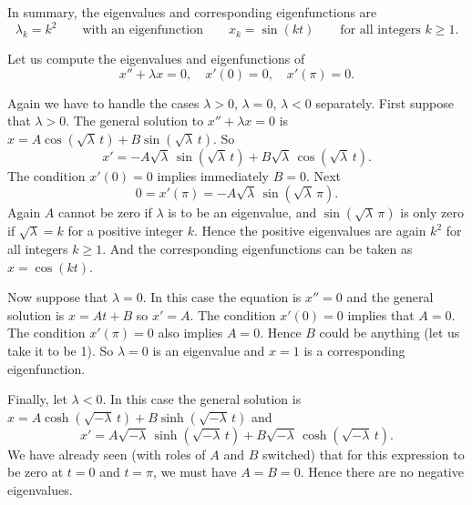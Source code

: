 \documentclass{ximera}
\begin{document}
\begin{exampleSol}
    In summary, the eigenvalues and corresponding eigenfunctions are
    \begin{equation*}
        \lambda_k = k^2 \qquad \text{with an eigenfunction} \qquad x_k = \sin (k t) \qquad \text{for all integers } k \geq 1 .
    \end{equation*}
\end{exampleSol}

\begin{example}
    Let us compute the eigenvalues and eigenfunctions of
    \begin{equation*}
        x'' + \lambda x = 0, \quad x'(0) = 0, \quad x'(\pi) = 0 .
    \end{equation*}
\end{example}

\begin{exampleSol}
    Again we have to handle the cases $\lambda > 0$, $\lambda = 0$, $\lambda < 0$ separately. First suppose that $\lambda > 0$. The general solution to $x''+\lambda x = 0$ is $x = A \cos ( \sqrt{\lambda}\, t) + B \sin ( \sqrt{\lambda}\, t)$.  So
    \begin{equation*}
        x' = -A\sqrt{\lambda}\, \sin ( \sqrt{\lambda}\, t) + B\sqrt{\lambda}\, \cos (\sqrt{\lambda}\, t) .
    \end{equation*}
    The condition $x'(0) = 0$ implies immediately $B = 0$. Next
    \begin{equation*}
        0 = x'(\pi) = -A\sqrt{\lambda}\, \sin ( \sqrt{\lambda}\, \pi) .
    \end{equation*}
    Again $A$ cannot be zero if $\lambda$ is to be an eigenvalue, and $\sin ( \sqrt{\lambda}\, \pi)$ is only zero if $\sqrt{\lambda} = k$ for a positive integer $k$. Hence the positive eigenvalues are again $k^2$ for all integers $k \geq 1$.  And the corresponding eigenfunctions can be taken as $x=\cos (k t)$.
    
    Now suppose that $\lambda = 0$.  In this case the equation is $x'' = 0$ and the general solution is $x = At + B$ so $x' = A$.  The condition $x'(0) = 0$ implies that $A=0$.  The condition $x'(\pi) = 0$ also implies $A=0$. Hence $B$ could be anything (let us take it to be 1).  So $\lambda = 0$ is an eigenvalue and $x=1$ is a corresponding eigenfunction.
    
    Finally, let $\lambda < 0$.  In this case the general solution is $x = A \cosh ( \sqrt{-\lambda}\, t) + B \sinh ( \sqrt{-\lambda}\, t)$ and
    \begin{equation*}
        x' = A\sqrt{-\lambda}\, \sinh ( \sqrt{-\lambda}\, t) + B\sqrt{-\lambda}\, \cosh ( \sqrt{-\lambda}\, t ) .
    \end{equation*}
    We have already seen (with roles of $A$ and $B$ switched) that for this expression to be zero at $t=0$ and $t=\pi$, we must have $A=B=0$.  Hence there are no negative eigenvalues.
    

\end{exampleSol}
\end{document}
